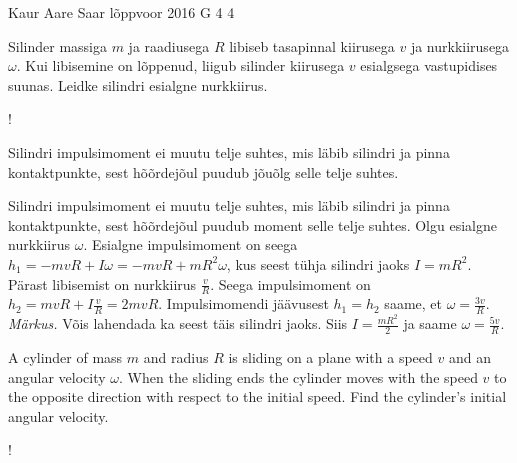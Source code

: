{Kaur Aare Saar} %
{lõppvoor} %
{2016} %
{G 4} %
{4} %
{
\ifStatement
Silinder massiga $m$ ja raadiusega $R$ libiseb tasapinnal kiirusega  $v$ ja nurkkiirusega $\omega$. Kui libisemine on lõppenud, liigub silinder kiirusega $v$ esialgsega vastupidises suunas. Leidke silindri esialgne nurkkiirus.

\begin{center}
	\begin{resizebox}{0.35\linewidth}{!}{
			}
	\end{resizebox}
\end{center}
\fi


\ifHint
Silindri impulsimoment ei muutu telje suhtes, mis läbib silindri ja pinna kontaktpunkte, sest hõõrdejõul puudub jõuõlg selle telje suhtes.
\fi


\ifSolution
Silindri impulsimoment ei muutu telje suhtes, mis läbib silindri ja pinna kontaktpunkte, sest hõõrdejõul puudub moment selle telje suhtes. Olgu esialgne nurkkiirus $\omega$. Esialgne impulsimoment on seega $h_1=-mvR+I\omega=-mvR+mR^2\omega$, kus seest tühja silindri jaoks $I=mR^2$. Pärast libisemist on nurkkiirus $\frac{v}{R}$. Seega impulsimoment on $h_2=mvR+I\frac{v}{R}=2mvR$.
Impulsimomendi jäävusest $h_1=h_2$ saame, et $\omega=\frac{3v}{R}$.\\
\emph{Märkus.} Võis lahendada ka seest täis silindri jaoks. Siis $I=\frac{mR^2}{2}$ ja saame $\omega = \frac{5v}{R}$.
\fi


\ifEngStatement
A cylinder of mass $m$ and radius $R$ is sliding on a plane with a speed $v$ and an angular velocity $\omega$. When the sliding ends the cylinder moves with the speed $v$ to the opposite direction with respect to the initial speed. Find the cylinder’s initial angular velocity.
\begin{center}
	\begin{resizebox}{0.35\linewidth}{!}{
			}
	\end{resizebox}
\end{center}
\fi


}
